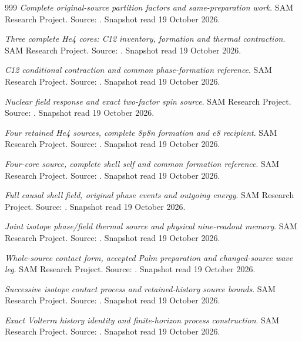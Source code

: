 \begin{thebibliography}{999}
 \emph{Complete original-source partition factors and same-preparation work}. SAM Research Project. Source: . Snapshot read 19 October 2026.

 \emph{Three complete He4 cores: C12 inventory, formation and thermal contraction}. SAM Research Project. Source: . Snapshot read 19 October 2026.

 \emph{C12 conditional contraction and common phase-formation reference}. SAM Research Project. Source: . Snapshot read 19 October 2026.

 \emph{Nuclear field response and exact two-factor spin source}. SAM Research Project. Source: . Snapshot read 19 October 2026.

 \emph{Four retained He4 sources, complete 8p8n formation and e8 recipient}. SAM Research Project. Source: . Snapshot read 19 October 2026.

 \emph{Four-core source, complete shell self and common formation reference}. SAM Research Project. Source: . Snapshot read 19 October 2026.

 \emph{Full causal shell field, original phase events and outgoing energy}. SAM Research Project. Source: . Snapshot read 19 October 2026.

 \emph{Joint isotope phase/field thermal source and physical nine-readout memory}. SAM Research Project. Source: . Snapshot read 19 October 2026.

 \emph{Whole-source contact form, accepted Palm preparation and changed-source wave leg}. SAM Research Project. Source: . Snapshot read 19 October 2026.

 \emph{Successive isotope contact process and retained-history source bounds}. SAM Research Project. Source: . Snapshot read 19 October 2026.

 \emph{Exact Volterra history identity and finite-horizon process construction}. SAM Research Project. Source: . Snapshot read 19 October 2026.


\end{thebibliography}
